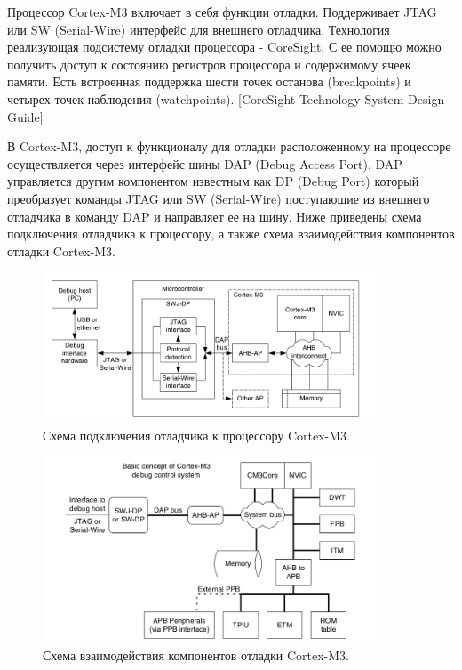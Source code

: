 Процессор Cortex-M3 включает в себя функции отладки. Поддерживает JTAG или SW (Serial-Wire) интерфейс для внешнего отладчика. Технология реализующая подсистему отладки процессора - CoreSight. С ее помощю можно получить доступ к состоянию регистров процессора и содержимому ячеек памяти. Есть встроенная поддержка шести точек останова (breakpoints) и четырех точек наблюдения (watchpoints). [CoreSight Technology System Design Guide]

В Cortex-M3, доступ к функционалу для отладки расположенному на процессоре осуществляется через интерфейс шины DAP (Debug Access Port). DAP управляется другим компонентом известным как DP (Debug Port) который преобразует команды JTAG или SW (Serial-Wire) поступающие из внешнего отладчика в команду DAP и направляет ее на шину. Ниже приведены схема подключения отладчика к процессору, а также  схема взаимодействия компонентов отладки Cortex-M3. 


\begin{figure}[h!]
    \centering
    \includegraphics[width=0.9\textwidth]{cortex_m3_debug_connection.png}
    \caption{Схема подключения отладчика к процессору Cortex-M3.}
\end{figure}


\begin{figure}[h!]
    \centering
    \includegraphics[width=0.9\textwidth]{cortex_m3_inside_debug_subsystem.png}
    \caption{Схема взаимодействия компонентов отладки Cortex-M3.}
\end{figure}

